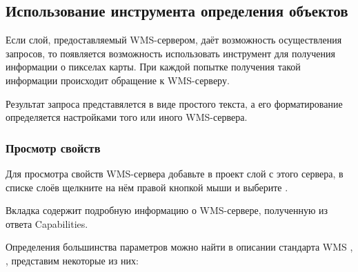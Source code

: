 \subsection{Использование инструмента определения
объектов}\label{sec:ogc-wms-identify}

Если слой, предоставляемый WMS-сервером, даёт возможность осуществления
запросов, то появляется возможность использовать инструмент
 для получения информации о
пикселах карты. При каждой попытке получения такой информации происходит
обращение к WMS-серверу.

Результат запроса представялется в виде простого текста,
а его форматирование определяется настройками того или иного WMS-сервера.

\subsubsection{Просмотр
свойств}\label{sec:ogc-wms-properties}

Для просмотра свойств WMS-сервера добавьте в проект слой с этого сервера, в
списке слоёв щелкните на нём правой кнопкой мыши и выберите .

\label{sec:ogc-wms-properties-metadata}

Вкладка  содержит подробную информацию о
WMS-сервере, полученную из ответа Capabilities.

Определения большинства параметров можно найти в описании стандарта WMS
\cite{OGCWMS010101web}, \cite{OGCWMS010300web}, представим некоторые из них:

